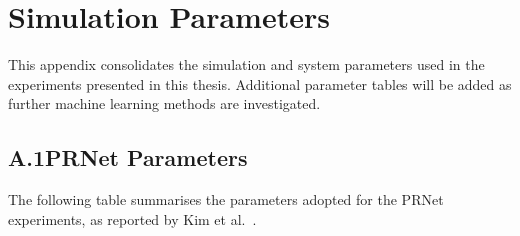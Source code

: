 \chapter{Simulation Parameters}
\label{app:simulation_params}

This appendix consolidates the simulation and system parameters used in the
experiments presented in this thesis. Additional parameter tables will be
added as further machine learning methods are investigated.


\section*{A.1\quad PRNet Parameters}

The following table summarises the parameters adopted for the PRNet
experiments, as reported by Kim et al.~\cite{kim2017novel}.

